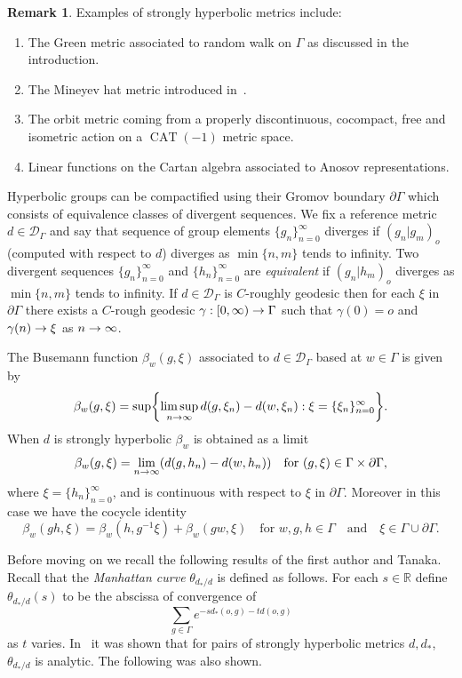 \documentclass[10pt]{amsart}
\theoremstyle{definition}\newtheorem{defi}[theo]{Definition}\newtheorem{rema}[theo]{Remark}\newtheorem{exam}[theo]{Example}\newtheorem{exem}[theo]{Example}\newtheorem{nota}[theo]{Notation}
\renewcommand{\b}{\beta}
\newcommand{\g}{\gamma}
\newcommand{\G}{\Gamma}
\newcommand{\x}{\xi}
\newcommand{\Dc}{\mathcal{D}}
\newcommand{\R}{\mathbb{R}}
\DeclareMathOperator{\CAT}{CAT}
\let\originalleft\left
\let\originalright\right
\renewcommand{\left}{\mathopen{}\mathclose\bgroup\originalleft}
\renewcommand{\right}{\aftergroup\egroup\originalright}
\renewcommand*{\to}{\mathchoice{\longrightarrow}{\rightarrow}{\rightarrow}{\rightarrow}}
\newcounter{setofcase}
\newcounter{case}[setofcase]
\theoremstyle{plain}
\begin{document}
\begin{rema}
Examples of strongly hyperbolic metrics include:
\begin{enumerate}
\item The Green metric associated to random walk on $\G$ as discussed in the introduction.

\item The Mineyev hat metric introduced in~\cite{MineyevFlow}.

\item The orbit metric coming from a properly discontinuous, cocompact, free and isometric action on a $\CAT(-1)$ metric space.

\item Linear functions on the Cartan algebra associated to Anosov representations.
\end{enumerate}
\end{rema}

Hyperbolic groups can be compactified using their Gromov boundary $\partial \G$ which consists of equivalence classes of divergent sequences. We fix a reference metric $d \in \Dc_\G$ and say that sequence of group elements $\{g_n\}_{n=0}^\infty$ diverges if $(g_n|g_m)_o$ (computed with respect to $d$) diverges as $\min\{n, m\}$ tends to infinity. Two divergent sequences $\{g_n\}_{n=0}^\infty$ and $\{h_n\}_{n=0}^\infty$ are \emph{equivalent} if $(g_n|h_m)_o$ diverges as $\min\{n, m\}$ tends to infinity. If $d \in \Dc_\G$ is $C$-roughly geodesic then for each $\x$ in $\partial \G$ there exists a $C$-rough geodesic $\g:[0, \infty) \to \G$ such that $\g(0)=o$ and $\g(n) \to \x$ as $n \to \infty$.

The Busemann function $ \beta_w(g, \x)$ associated to $d \in \Dc_\G$ based at $w \in \G$ is given by
\[
\beta_w(g,\x) = \sup\left\{ \limsup_{n\to\infty} d(g,\x_n) - d(w,\xi_n) : \x = \{ \x_n\}_{n=0}^\infty \right\}.
\]
When $d$ is strongly hyperbolic $\beta_w$ is obtained as a limit
\[
\b_w(g, \x)=\lim_{n \to \infty}\left(d(g, h_n)- d(w, h_n)\right) \quad \text{for }(g, \x) \in \G \times \partial \G,
\]
where $\x=\{h_n\}_{n=0}^\infty$, and is continuous with respect to $\x$ in $\partial \G$. Moreover in this case we have the cocycle identity
\[
\b_w(gh, \x)= \b_w(h, g^{-1}\x)+ \b_w(g w, \x) \quad \text{for }w, g, h \in \G\quad\text{and}\quad\x\in\G\cup \partial \G.
\]

Before moving on we recall the following results of the first author and Tanaka. Recall that the \emph{Manhattan curve} $\theta_{d_\ast/d}$ is defined as follows. For each $s \in \R$ define $\theta_{d_\ast/d}(s)$ to be the abscissa of convergence of
\[
\sum_{g\in\G} e^{-sd_\ast(o,g) - td(o,g)}
\]
as $t$ varies. In~\cite{cantrell.tanaka.2,cantrell.tanaka.1} it was shown that for pairs of strongly hyperbolic metrics $d,d_\ast$, $\theta_{d_\ast/d}$ is analytic. The following was also shown.
\end{document}
